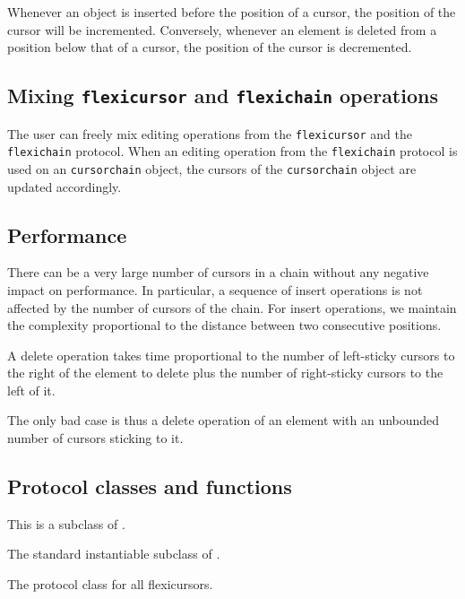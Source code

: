 \documentclass[11pt]{article}
\begin{document}
Whenever an object is inserted before the position of a
cursor, the position of the cursor will be incremented.  Conversely,
whenever an element is deleted from a position below that of a cursor,
the position of the cursor is decremented.

\subsection{Mixing \texttt{flexicursor} and \texttt{flexichain} operations}

The user can freely mix editing operations from the
\texttt{flexicursor} and the \texttt{flexichain} protocol.  When an
editing operation from the \texttt{flexichain} protocol is used on an
\texttt{cursorchain} object, the cursors of the \texttt{cursorchain}
object are updated accordingly.

\subsection{Performance}

There can be a very large number of cursors in a chain without any
negative impact on performance.  In particular, a sequence of insert
operations is not affected by the number of cursors of the chain.
For insert operations, we maintain the complexity proportional to the
distance between two consecutive positions.

A delete operation takes time proportional to the number of
left-sticky cursors to the right of the element to delete plus the
number of right-sticky cursors to the left of it.

The only bad case is thus a delete operation of an element with an
unbounded number of cursors sticking to it.

\subsection{Protocol classes and functions}


This is a subclass of .


The standard instantiable subclass of .


The protocol class for all flexicursors.

\end{document}

